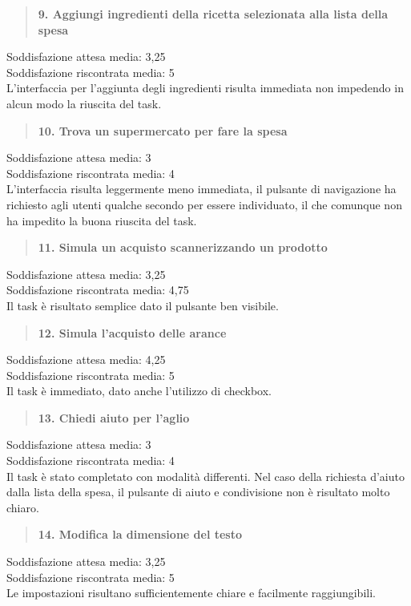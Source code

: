 \begin{quote}
	\textbf{9. Aggiungi ingredienti della ricetta selezionata alla lista della
	spesa}
\end{quote}
Soddisfazione attesa media: 3,25\\
Soddisfazione riscontrata media: 5\\
L'interfaccia per l'aggiunta degli ingredienti risulta immediata non impedendo in alcun modo la riuscita del task.

\begin{quote}
	\textbf{10. Trova un supermercato per fare la spesa}
\end{quote}
Soddisfazione attesa media: 3\\
Soddisfazione riscontrata media: 4\\
L'interfaccia risulta leggermente meno immediata, il pulsante di navigazione ha
richiesto agli utenti qualche secondo per essere individuato, il che comunque non
ha impedito la buona riuscita del task.

\begin{quote}
	\textbf{11. Simula un acquisto scannerizzando un prodotto}
\end{quote}
Soddisfazione attesa media: 3,25\\
Soddisfazione riscontrata media: 4,75\\
Il task è risultato semplice dato il pulsante ben visibile.

\begin{quote}
	\textbf{12. Simula l'acquisto delle arance}
\end{quote}
Soddisfazione attesa media: 4,25\\
Soddisfazione riscontrata media: 5\\
Il task è immediato, dato anche l'utilizzo di checkbox.

\begin{quote}
	\textbf{13. Chiedi aiuto per l'aglio}
\end{quote}
Soddisfazione attesa media: 3\\
Soddisfazione riscontrata media: 4\\
Il task è stato completato con modalità differenti.  Nel caso della richiesta
d'aiuto dalla lista della spesa, il pulsante di aiuto e condivisione non è
risultato molto chiaro.

\begin{quote}
	\textbf{14. Modifica la dimensione del testo}
\end{quote}
Soddisfazione attesa media: 3,25\\
Soddisfazione riscontrata media: 5\\
Le impostazioni risultano sufficientemente chiare e facilmente raggiungibili.

